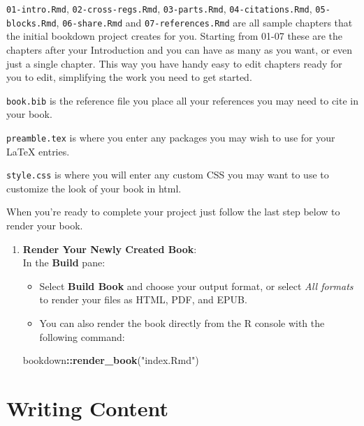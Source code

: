 \documentclass[
]{book}
\newenvironment{Shaded}{\begin{snugshade}}{\end{snugshade}}
\newcommand{\FunctionTok}[1]{\textcolor[rgb]{0.13,0.29,0.53}{\textbf{#1}}}
\newcommand{\NormalTok}[1]{#1}
\newcommand{\SpecialCharTok}[1]{\textcolor[rgb]{0.81,0.36,0.00}{\textbf{#1}}}
\newcommand{\StringTok}[1]{\textcolor[rgb]{0.31,0.60,0.02}{#1}}
\providecommand{\tightlist}{%
  \setlength{\itemsep}{0pt}\setlength{\parskip}{0pt}}
\theoremstyle{definition}
\theoremstyle{definition}
\theoremstyle{definition}
\theoremstyle{definition}
\theoremstyle{remark}
\begin{document}
\texttt{01-intro.Rmd}, \texttt{02-cross-regs.Rmd}, \texttt{03-parts.Rmd}, \texttt{04-citations.Rmd}, \texttt{05-blocks.Rmd}, \texttt{06-share.Rmd} and \texttt{07-references.Rmd} are all sample chapters that the initial bookdown project creates for you. Starting from 01-07 these are the chapters after your Introduction and you can have as many as you want, or even just a single chapter. This way you have handy easy to edit chapters ready for you to edit, simplifying the work you need to get started.

\texttt{book.bib} is the reference file you place all your references you may need to cite in your book.

\texttt{preamble.tex} is where you enter any packages you may wish to use for your LaTeX entries.

\texttt{style.css} is where you will enter any custom CSS you may want to use to customize the look of your book in html.

When you're ready to complete your project just follow the last step below to render your book.

\begin{enumerate}
\def\labelenumi{\arabic{enumi}.}
\setcounter{enumi}{5}
\tightlist
\item
  \textbf{Render Your Newly Created Book}:\\
  In the \textbf{Build} pane:

  \begin{itemize}
  \tightlist
  \item
    Select \textbf{Build Book} and choose your output format, or select \emph{All formats} to render your files as HTML, PDF, and EPUB.
  \item
    You can also render the book directly from the R console with the following command:
  \end{itemize}

\begin{Shaded}
\begin{Highlighting}[]
\NormalTok{bookdown}\SpecialCharTok{::}\FunctionTok{render\_book}\NormalTok{(}\StringTok{"index.Rmd"}\NormalTok{)}
\end{Highlighting}
\end{Shaded}
\end{enumerate}

\chapter{Writing Content}\label{chapter3}
\end{document}
